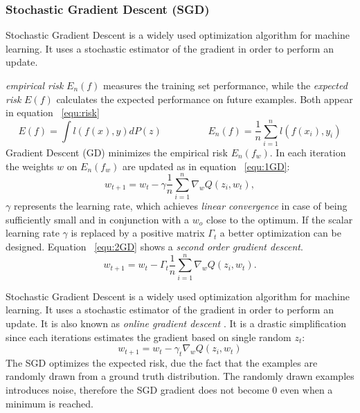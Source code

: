 \subsubsection{Stochastic Gradient Descent (SGD)}
\label{subsub:SGD}
Stochastic Gradient Descent is a widely used optimization algorithm for machine learning. It uses a stochastic estimator of the gradient in order to perform an update.  

\textit{empirical risk} $E_n(f)$ measures the training set performance, while the \textit{expected risk} $E(f)$ calculates the expected performance on future examples. Both appear in equation ~\ref{equ:risk}
\begin{equation}
 E(f)= \int l(f(x),y)dP(z) \hspace{2cm} E_n(f) = \frac{1}{n}\sum\limits_{i=1}^nl(f(x_i),y_i)
 \label{equ:risk}
\end{equation}
Gradient Descent (GD) minimizes the empirical risk $E_n(f_w)$. In each iteration the weights $w$ on $E_n(f_w)$ are updated as in equation ~\ref{equ:1GD}:
\begin{equation}
 w_{t+1} = w_t-\gamma\frac{1}{n}\sum\limits_{i=1}^n\nabla_wQ(z_i,w_t),
 \label{equ:1GD}
\end{equation}
$\gamma$ represents the learning rate, which achieves \textit{linear convergence} in case of being sufficiently small and in conjunction with a $w_o$ close to the optimum.
If the scalar learning rate $\gamma$ is replaced by a positive matrix $\Gamma_t$ a better optimization can be designed. Equation ~\ref{equ:2GD} shows a \textit{second order gradient descent}. 
\begin{equation}
 w_{t+1}= w_t-\Gamma_t\frac{1}{n}\sum\limits_{i=1}^{n}\nabla_wQ(z_i,w_t).
 \label{equ:2GD}
\end{equation}

Stochastic Gradient Descent is a widely used optimization algorithm for machine learning. It uses a stochastic estimator of the gradient in order to perform an update. It is also known as \textit{online gradient descent} . It is a drastic simplification since each iterations estimates the gradient based on single random $z_t$:
\begin{equation}
 w_{t+1} = w_t - \gamma_t \nabla_w Q(z_i,w_t)
 \label{equ:SGD}
\end{equation}
The SGD optimizes the expected risk, due the fact that the examples are randomly drawn from a ground truth distribution. The randomly drawn examples introduces noise, therefore the SGD gradient does not become 0 even when a minimum is reached.


